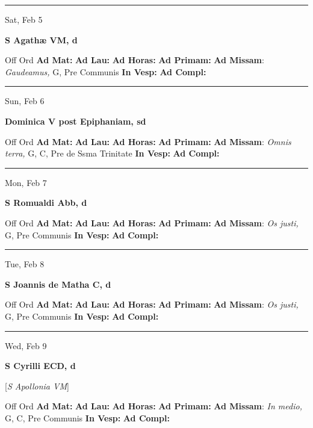 \documentclass[letterpaper, 10pt]{article}
\begin{document}
\hrule
\begin{center}
Sat, Feb 5
\end{center}\textbf{ \large S Agathæ VM, \textnormal{\normalsize d}}
\begin{justify}
Off Ord
\textbf{Ad Mat: }
\textbf{Ad Lau: }
\textbf{Ad Horas: }
\textbf{Ad Primam: }
\textbf{Ad Missam}: \textit{Gaudeamus,} G, Pre Communis
\textbf{In Vesp: }
\textbf{Ad Compl: }\end{justify}



\hrule
\begin{center}
Sun, Feb 6
\end{center}\textbf{ \large Dominica V post Epiphaniam, \textnormal{\normalsize sd}}
\begin{justify}
Off Ord
\textbf{Ad Mat: }
\textbf{Ad Lau: }
\textbf{Ad Horas: }
\textbf{Ad Primam: }
\textbf{Ad Missam}: \textit{Omnis terra,} G, C, Pre de Ssma Trinitate
\textbf{In Vesp: }
\textbf{Ad Compl: }\end{justify}



\hrule
\begin{center}
Mon, Feb 7
\end{center}\textbf{ \large S Romualdi Abb, \textnormal{\normalsize d}}
\begin{justify}
Off Ord
\textbf{Ad Mat: }
\textbf{Ad Lau: }
\textbf{Ad Horas: }
\textbf{Ad Primam: }
\textbf{Ad Missam}: \textit{Os justi,} G, Pre Communis
\textbf{In Vesp: }
\textbf{Ad Compl: }\end{justify}



\hrule
\begin{center}
Tue, Feb 8
\end{center}\textbf{ \large S Joannis de Matha C, \textnormal{\normalsize d}}
\begin{justify}
Off Ord
\textbf{Ad Mat: }
\textbf{Ad Lau: }
\textbf{Ad Horas: }
\textbf{Ad Primam: }
\textbf{Ad Missam}: \textit{Os justi,} G, Pre Communis
\textbf{In Vesp: }
\textbf{Ad Compl: }\end{justify}



\hrule
\begin{center}
Wed, Feb 9
\end{center}\textbf{ \large S Cyrilli ECD, \textnormal{\normalsize d}}

[\textit{S Apollonia VM}]
\begin{justify}
Off Ord
\textbf{Ad Mat: }
\textbf{Ad Lau: }
\textbf{Ad Horas: }
\textbf{Ad Primam: }
\textbf{Ad Missam}: \textit{In medio,} G, C, Pre Communis
\textbf{In Vesp: }
\textbf{Ad Compl: }\end{justify}
\end{document}
